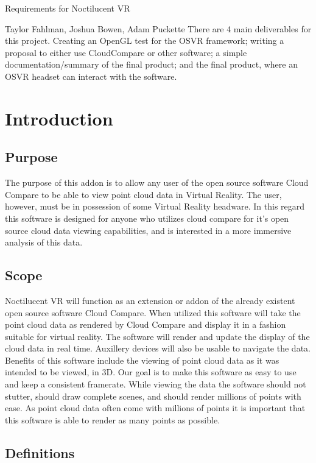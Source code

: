 \documentclass[titlepage]{article}
\begin{document}
\begin{titlepage}
\centering
{\Huge Requirements for Noctilucent VR\par}
{\Large Taylor Fahlman, Joshua Bowen, Adam Puckette}
\abstract
There are 4 main deliverables for this project. Creating an OpenGL test for the OSVR framework;
writing a proposal to either use CloudCompare or other software; a simple documentation/summary of
the final product; and the final product, where an OSVR headset can interact with the software.
\end{titlepage}

\section{Introduction}
\subsection{Purpose}

The purpose of this addon is to allow any user of the open source software Cloud Compare to be able to view point cloud data in Virtual Reality.
The user, however, must be in possession of some Virtual Reality headware. 
In this regard this software is designed for anyone who utilizes cloud compare for it's open source cloud data viewing capabilities,
and is interested in a more immersive analysis of this data.

\subsection{Scope}

Noctilucent VR will function as an extension or addon of the already existent open source software Cloud Compare.
When utilized this software will take the point cloud data as rendered by Cloud Compare and display it in a fashion suitable for virtual reality.
The software will render and update the display of the cloud data in real time.
Auxillery devices will also be usable to navigate the data.
Benefits of this software include the viewing of point cloud data as it was intended to be viewed, in 3D.
Our goal is to make this software as easy to use and keep a consistent framerate.
While viewing the data the software should not stutter,
should draw complete scenes,
and should render millions of points with ease.
As point cloud data often come with millions of points it is important that this software is able to render as many points as possible.

\subsection{Definitions}
\end{document}
